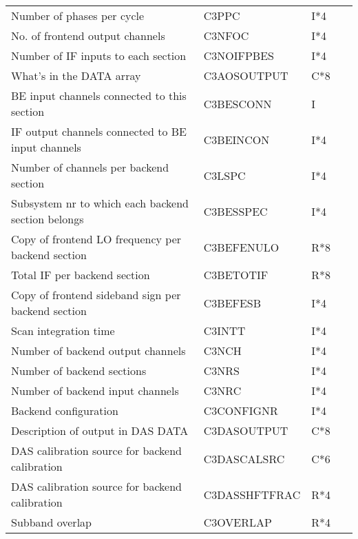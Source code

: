 \begin{tabular}{||l|l|l|l||}
Number of phases per cycle           & C3PPC    & I*4    &  ~    \\      
No. of frontend output channels      & C3NFOC   & I*4    &  ~    \\      
Number of IF inputs to each section  & C3NOIFPBES  & I*4 &  ~    \\      
What's in the DATA array             & C3AOSOUTPUT & C*8 &  ~    \\      
BE input channels connected to this section        & C3BESCONN & I     &  ~    \\      
IF output channels connected to BE input channels  & C3BEINCON & I*4   &  ~    \\      
Number of channels per backend section             & C3LSPC    & I*4   &  ~    \\      
Subsystem nr to which each backend section belongs & C3BESSPEC & I*4   &  ~    \\      
Copy of frontend LO frequency per backend section  & C3BEFENULO & R*8  &  ~    \\      
Total IF per backend section                       & C3BETOTIF & R*8   &  ~    \\      
Copy of frontend sideband sign per backend section & C3BEFESB  & I*4   &  ~    \\      
Scan integration time                              & C3INTT   & I*4    &  ~    \\      
Number of backend output channels                  & C3NCH    & I*4    &  ~    \\      
Number of backend sections                         & C3NRS    & I*4    &  ~    \\      
Number of backend input channels                   & C3NRC    & I*4    &  ~    \\      
Backend configuration                              & C3CONFIGNR & I*4  &  ~    \\      
Description of output in DAS DATA                  & C3DASOUTPUT & C*8 &  ~    \\      
DAS calibration source for backend calibration     & C3DASCALSRC & C*6 &  ~    \\      
DAS calibration source for backend calibration     & C3DASSHFTFRAC &R*4&  ~    \\      
Subband overlap                                    & C3OVERLAP & R*4   &  ~    \\ \hline
\end{tabular}
 \\


